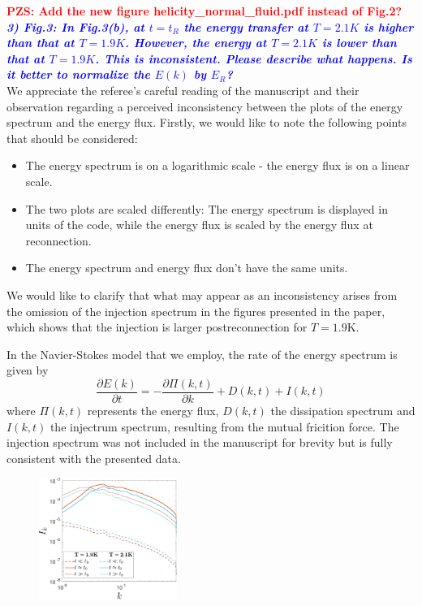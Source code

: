 \documentclass[a4paper,10pt]{article}
\def\red#1{\textcolor{red}{#1}}
\def\blue#1{\textcolor{blue}{#1}}
\def\refcomment#1{\textbf{\blue{\emph{#1}}}\\}
\begin{document}
    \red{\bfseries PZS: Add the new figure helicity\_normal\_fluid.pdf instead of Fig.2?}\\

    \refcomment{3) Fig.3: In Fig.3(b), at $t = t_R$ the energy transfer at $T = 2.1K$ is
    higher than that at $T = 1.9K$. However, the energy at $T = 2.1K$ is lower
    than that at $T = 1.9K$. This is inconsistent. Please describe what
    happens. Is it better to normalize the $E(k)$ by $E_R$?}

    We appreciate the referee’s careful reading of the manuscript and their observation regarding a perceived inconsistency between the plots of the energy spectrum and the energy flux. Firstly, we would like to note the following points that should be considered:
    \begin{itemize}
        \item The energy spectrum is on a logarithmic scale - the energy flux is on a linear scale.
        \item The two plots are scaled differently: The energy spectrum is displayed in units of the code, while the energy flux is scaled by the energy flux at reconnection.
        \item The energy spectrum and energy flux don't have the same units.
    \end{itemize}
    We would like to clarify that what may appear as an inconsistency arises from the omission of the injection spectrum in the figures presented in the paper, which shows that the injection is larger postreconnection for $T=1.9$K.
    
    In the Navier-Stokes model that we employ, the rate of the energy spectrum is given by
    \begin{equation}
        \frac{\partial E(k)}{\partial t} = -\frac{\partial \Pi(k,t)}{\partial k} + D(k,t) + I(k,t)
    \end{equation}
    where $\Pi(k,t)$ represents the energy flux, $D(k,t)$ the dissipation spectrum and $I(k,t)$ the injectrum spectrum, resulting from the mutual fricition force. The injection spectrum was not included in the manuscript for brevity but is fully consistent with the presented data.

    \begin{figure}[H]
        \centering
        \includegraphics[width=0.4\textwidth]{inj-spec.pdf}
    \end{figure}
\end{document}
